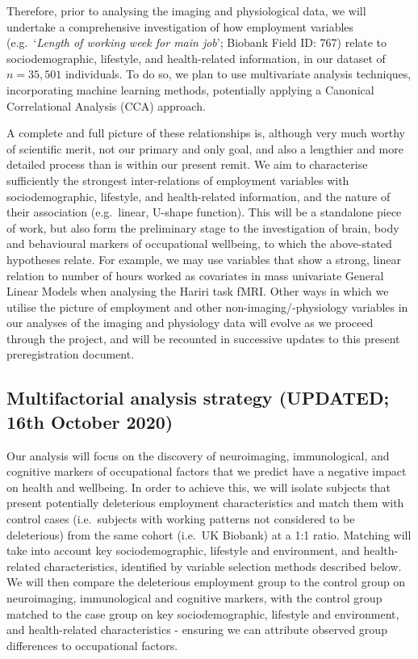 \documentclass[
]{article}
\begin{document}
Therefore, prior to analysing the imaging and physiological data, we
will undertake a comprehensive investigation of how employment variables
(e.g.~`\emph{Length of working week for main job}'; Biobank Field ID:
767) relate to sociodemographic, lifestyle, and health-related
information, in our dataset of \(n=35,501\) individuals. To do so, we
plan to use multivariate analysis techniques, incorporating machine
learning methods, potentially applying a Canonical Correlational
Analysis (CCA) approach.

A complete and full picture of these relationships is, although very
much worthy of scientific merit, not our primary and only goal, and also
a lengthier and more detailed process than is within our present remit.
We aim to characterise sufficiently the strongest inter-relations of
employment variables with sociodemographic, lifestyle, and
health-related information, and the nature of their association
(e.g.~linear, U-shape function). This will be a standalone piece of
work, but also form the preliminary stage to the investigation of brain,
body and behavioural markers of occupational wellbeing, to which the
above-stated hypotheses relate. For example, we may use variables that
show a strong, linear relation to number of hours worked as covariates
in mass univariate General Linear Models when analysing the Hariri task
fMRI. Other ways in which we utilise the picture of employment and other
non-imaging/-physiology variables in our analyses of the imaging and
physiology data will evolve as we proceed through the project, and will
be recounted in successive updates to this present preregistration
document.

\newpage

\hypertarget{multifactorial-analysis-strategy-updated-16th-october-2020}{%
\subsection{Multifactorial analysis strategy (UPDATED; 16th October
2020)}\label{multifactorial-analysis-strategy-updated-16th-october-2020}}

Our analysis will focus on the discovery of neuroimaging, immunological,
and cognitive markers of occupational factors that we predict have a
negative impact on health and wellbeing. In order to achieve this, we
will isolate subjects that present potentially deleterious employment
characteristics and match them with control cases (i.e.~subjects with
working patterns not considered to be deleterious) from the same cohort
(i.e.~UK Biobank) at a 1:1 ratio. Matching will take into account key
sociodemographic, lifestyle and environment, and health-related
characteristics, identified by variable selection methods described
below. We will then compare the deleterious employment group to the
control group on neuroimaging, immunological and cognitive markers, with
the control group matched to the case group on key sociodemographic,
lifestyle and environment, and health-related characteristics - ensuring
we can attribute observed group differences to occupational factors.
\end{document}
